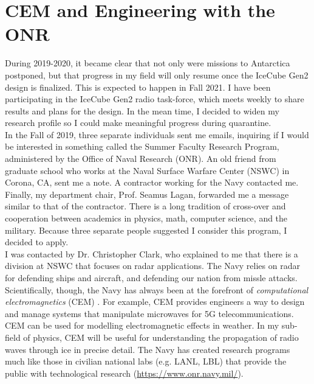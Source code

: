 \documentclass[../../../main.tex]{subfiles}
\begin{document}
\section{CEM and Engineering with the ONR}
\label{sec:naval_research}

During 2019-2020, it became clear that not only were missions to Antarctica postponed, but that progress in my field will only resume once the IceCube Gen2 design is finalized.  This is expected to happen in Fall 2021.  I have been participating in the IceCube Gen2 radio task-force, which meets weekly to share results and plans for the design.  In the mean time, I decided to widen my research profile so I could make meaningful progress during quarantine.
\\
\vspace{0.25cm}
In the Fall of 2019, three separate individuals sent me emails, inquiring if I would be interested in something called the Summer Faculty Research Program, administered by the Office of Naval Research (ONR).  An old friend from graduate school who works at the Naval Surface Warfare Center (NSWC) in Corona, CA, sent me a note.  A contractor working for the Navy contacted me.  Finally, my department chair, Prof. Seamus Lagan, forwarded me a message similar to that of the contractor.  There is a long tradition of cross-over and cooperation between academics in physics, math, computer science, and the military.  Because three separate people suggested I consider this program, I decided to apply.
\\
\vspace{0.25cm}
I was contacted by Dr. Christopher Clark, who explained to me that there is a division at NSWC that focuses on radar applications.  The Navy relies on radar for defending ships and aircraft, and defending our nation from missle attacks.  Scientifically, though, the Navy has always been at the forefront of \textit{computational electromagnetics} (CEM) \cite{cem}.  For example, CEM provides engineers a way to design and manage systems that manipulate microwaves for 5G telecommunications.  CEM can be used for modelling electromagnetic effects in weather.  In my sub-field of physics, CEM will be useful for understanding the propagation of radio waves through ice in precise detail.  The Navy has created research programs much like those in civilian national labs (e.g. LANL, LBL) that provide the public with technological research (\url{https://www.onr.navy.mil/}).
\\
\vspace{0.25cm}
\end{document}
